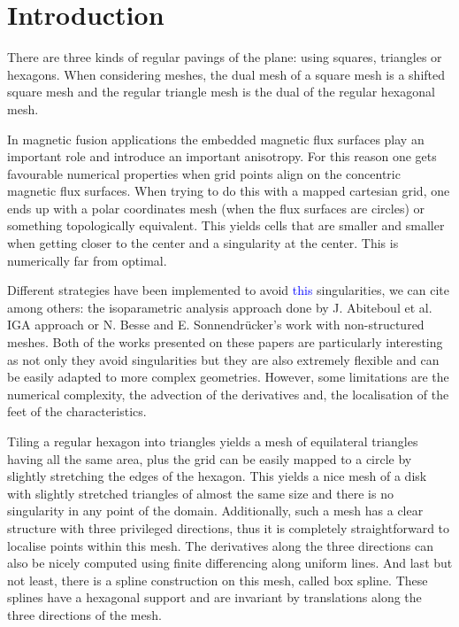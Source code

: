 \documentclass[proc]{edpsmath}
\begin{document}
\maketitle


\section*{Introduction}


There are three kinds of regular pavings of the plane: using squares, triangles or hexagons. When considering meshes, the dual mesh of a square mesh is a shifted square mesh and the regular triangle mesh is the dual of the regular hexagonal mesh.

In magnetic fusion applications the embedded magnetic flux surfaces play an important role and introduce an important anisotropy\cite{Angelino2009}. For this reason one gets favourable numerical properties when grid points align on the concentric magnetic flux surfaces. When trying to do this with a mapped cartesian grid, one ends up with a polar coordinates mesh (when the flux surfaces are circles) or something topologically equivalent. This yields cells that are smaller and smaller when getting closer to the center and a singularity at the center. This is numerically far from optimal. 

Different strategies have been implemented to avoid \textcolor{blue}{this} singularities, we can cite among others: the isoparametric analysis approach done by J. Abiteboul et al. \cite{abiteboul2011solving} IGA approach or N. Besse and E. Sonnendr\"{u}cker's work with non-structured meshes\cite{Besse2003341}. Both of the works presented on these papers are particularly interesting as not only they avoid singularities but they are also extremely flexible and can be easily adapted to more complex geometries. However, some limitations are the numerical complexity, the advection of the derivatives and, the localisation of the feet of the characteristics. 

Tiling a regular hexagon into triangles yields a mesh of equilateral triangles having all the same area, plus the grid can be easily mapped to a circle by slightly stretching the edges of the hexagon. This yields a nice mesh of a disk with slightly stretched triangles of almost the same size and there is no singularity in any point of the domain. 
Additionally, such a mesh has a clear structure with three privileged directions, thus it is completely straightforward to localise points within this mesh. The derivatives along the three directions can also be nicely computed using finite differencing along uniform lines. And last but not least, there is a spline construction on this mesh, called box spline. These splines have a hexagonal support and are invariant by translations along the three directions of the mesh. 
\end{document}

